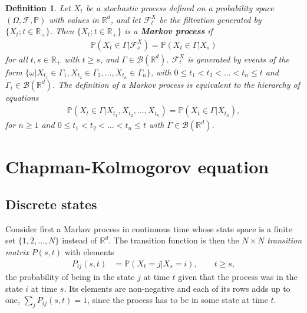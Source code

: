 \documentclass[11pt]{article}
\newtheorem{definition}{Definition}[section]
\begin{document}
\begin{definition}
Let $X_t$ be a stochastic process defined on a probability space $(\Omega,\mathcal{F},\mathbb{P})$ with values in $\mathbb{R}^d$, and let $\mathcal{F}^X_t$ be the filtration generated by $\{X_t;t\in\mathbb{R}_+\}$. Then $\{X_t;t\in\mathbb{R}_+\}$ is a {\bf Markov process} if
\begin{align}
  \mathbb{P}(X_t\in\Gamma|\mathcal{F}^X_s)=\mathbb{P}(X_t\in\Gamma|X_s)
\end{align}
for all $t,s\in\mathbb{R}_+$ with $t\geq s$, and $\Gamma\in\mathcal{B}(\mathbb{R}^d)$. $\mathcal{F}^X_t$ is generated by events of the form $\{\omega |X_{t_1}\in\Gamma_1,X_{t_2}\in\Gamma_2,\dots,X_{t_n}\in\Gamma_n\}$, with $0\leq t_1<t_2<\dots<t_n\leq t$ and $\Gamma_i\in\mathcal{B}(\mathbb{R}^d)$. The definition of a Markov process is equivalent to the hierarchy of equations
\begin{align}
  \mathbb{P}(X_t\in\Gamma|X_{t_1},X_{t_2},\dots,X_{t_n})=\mathbb{P}(X_t\in\Gamma|X_{t_n}),\nonumber
\end{align}
for $n\geq 1$ and $0\leq t_1<t_2<\dots<t_n\leq t$ with $\Gamma\in\mathcal{B}(\mathbb{R}^d)$.
\end{definition}


\section{Chapman-Kolmogorov equation}
\subsection{Discrete states}
Consider first a Markov process in continuous time whose state space is a finite set $\{1,2,\dots,N\}$ instead of $\mathbb{R}^d$. The transition function is then the $N\times N$ {\it transition matrix} $P(s,t)$ with elements
\begin{align}
  P_{ij}(s,t)&=\mathbb{P}(X_t=j|X_s=i),\qquad t\geq s,
\end{align}
the probability of being in the state $j$ at time $t$ given that the process was in the state $i$ at time $s$. Its elements are non-negative and each of its rows adds up to one, $\sum_jP_{ij}(s,t)=1$, since the process has to be in some state at time $t$.
\end{document}
